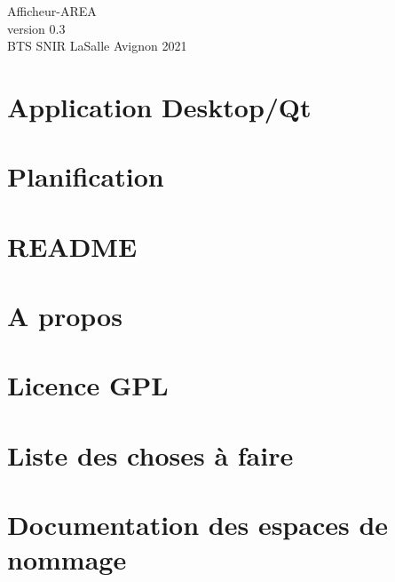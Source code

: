 \documentclass[twoside]{article}
\newcommand{\+}{\discretionary{\mbox{\scriptsize$\hookleftarrow$}}{}{}}
\begin{document}
\hypersetup{pageanchor=false,
             bookmarksnumbered=true,
             pdfencoding=unicode
            }
\begin{titlepage}
\vspace*{7cm}

\begin{center}%
{\LARGE Afficheur-\/\+A\+R\+EA}\\
\vspace*{1cm}
{\large version 0.\+3}\\
\vspace*{1cm}
{\large B\+T\+S S\+N\+I\+R La\+Salle Avignon 2021}\\
\end{center}
\end{titlepage}
\tableofcontents
{}
\hypersetup{pageanchor=true}

\section{Application Desktop/\+Qt}
\label{index}\hypertarget{index}{}
\section{Planification}
\label{md_planification}

\section{R\+E\+A\+D\+ME}
\label{page__r_e_a_d_m_e}

\section{A propos}
\label{page_about}

\section{Licence G\+PL}
\label{page_licence}

\section{Liste des choses à faire}
\label{todo}

\section{Documentation des espaces de nommage}

\end{document}
